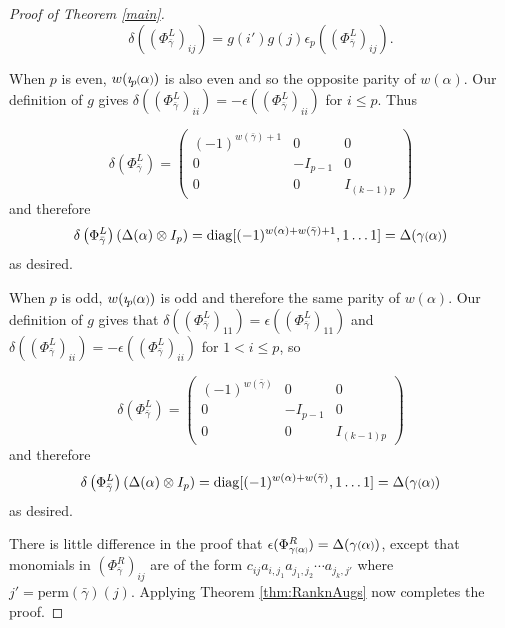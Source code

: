 \documentclass[11pt]{amsart}
\def\fp{{\scriptstyle \bar{\bar{p}}}}
\newcommand*{\smallp}[1]{\scalebox{.75}{\ensuremath#1}}
\newcommand*{\subsmallp}[1]{\scalebox{.5}{\ensuremath#1}}
\newcommand{\pp}[2][p]{\imath_{\hspace*{-1pt}#1}\hspace*{-.5pt}\smallp(#2\smallp)}
\newcommand\diag{\operatorname{diag}}
\theoremstyle{definition}
\begin{document}
\begin{proof}[Proof of Theorem \ref{main}]
$$\delta\left(\left(\Phi_{\bar\gamma}^L\right)_{ij}\right) = g(i')g(j)\epsilon_p\left(\left(\Phi_{\bar\gamma}^L\right)_{ij}\right).$$

When $p$ is even, $w(\pp\alpha)$ is also even and so the opposite parity of $w(\alpha)$. Our definition of $g$ gives $\delta\left(\left(\Phi_{\bar\gamma}^L\right)_{ii}\right) = -\epsilon\left(\left(\Phi_{\bar\gamma}^L\right)_{ii}\right)$ for $i\le p$. Thus 

$$\delta\left(\Phi_{\bar\gamma}^L\right) = 
\left( \begin{array}{ccc}
(-1)^{w(\bar\gamma)+1} & 0 & 0 \\
0 & -I_{p-1} & 0 \\
0 & 0 & I_{(k-1)p} \end{array} \right)
$$
\noindent and therefore
$$
\delta\left(\Phi_{\bar\gamma}^L\right)\left(\Delta(\alpha)\otimes I_p\right) = \diag[(-1)^{w(\alpha) + w(\bar\gamma) + 1},1\ldots 1] = \Delta(\gamma\smallp(\alpha\smallp))
$$
\noindent as desired.

When $p$ is odd, $w(\pp\alpha)$ is odd and therefore the same parity of $w(\alpha)$. Our definition of $g$ gives that $\delta\left(\left(\Phi_{\bar\gamma}^L\right)_{11}\right) = \epsilon\left(\left(\Phi_{\bar\gamma}^L\right)_{11}\right)$ and $\delta\left(\left(\Phi_{\bar\gamma}^L\right)_{ii}\right) = -\epsilon\left(\left(\Phi_{\bar\gamma}^L\right)_{ii}\right)$ for $1<i\le p$, so 

$$\delta\left(\Phi_{\bar\gamma}^L\right) = 
\left( \begin{array}{ccc}
(-1)^{w(\bar\gamma)} & 0 & 0 \\
0 & -I_{p-1} & 0 \\
0 & 0 & I_{(k-1)p} \end{array} \right)
$$
\noindent and therefore
$$
\delta\left(\Phi_{\bar\gamma}^L\right)\left(\Delta(\alpha)\otimes I_p\right)= \diag[(-1)^{w(\alpha) + w(\bar\gamma)},1\ldots 1] = \Delta(\gamma\smallp(\alpha\smallp))
$$
\noindent as desired. 

There is little difference in the proof that $\epsilon(\Phi_{\gamma\subsmallp(\alpha\subsmallp)}^R) = \Delta(\gamma\smallp(\alpha\smallp))$, except that monomials in $(\Phi_{\bar\gamma}^R)_{ij}$ are of the form $c_{ij}a_{i,j_1}a_{j_1,j_2}\cdots a_{j_k,j'}$ where $j'=\text{perm}(\bar\gamma)(j)$. Applying Theorem \ref{thm:RanknAugs} now completes the proof.
\end{proof}
\end{document}
